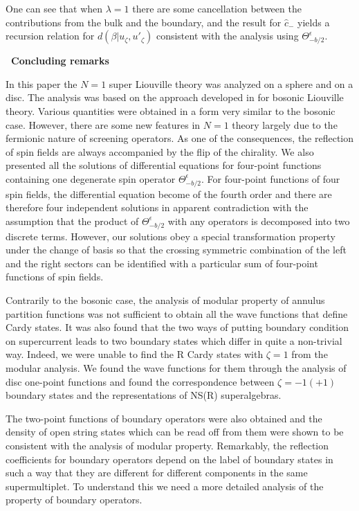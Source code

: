 \documentclass[a4paper,12pt]{article}
\def\section#1{
    \addtocounter{section}{1}\setcounter{subsection}{0}\setcounter{equation}{0}
    \vskip8mm\begin{center}{\bf\thesection~#1}\end{center}}
\newcommand{\ep}{{\epsilon}}
\begin{document}
 One can see that when $\lambda=1$ there are some cancellation
 between the contributions from the bulk and the boundary,
 and the result for $\hat{c}_-$ yields a recursion relation
 for $d(\beta|u_\zeta,u'_\zeta)$ consistent with the analysis
 using $\Theta_{-b/2}^\ep$.
 
\section{Concluding remarks}%

   In this paper the $N=1$ super Liouville theory was analyzed
 on a sphere and on a disc.
 The analysis was based on the approach developed in
 \cite{T,ZZ2,FZZ,ZZ} for bosonic Liouville theory.
 Various quantities were obtained in a form very similar to the
 bosonic case.
 However, there are some new features in $N=1$ theory largely
 due to the fermionic nature of screening operators.
 As one of the consequences, the reflection of spin fields
 are always accompanied by the flip of the chirality.
 We also presented all the solutions of differential equations
 for four-point functions containing one degenerate spin operator
 $\Theta_{-b/2}^{\ep}$.
 For four-point functions of four spin fields, the differential
 equation become of the fourth order and there are therefore four
 independent solutions in apparent contradiction with the assumption
 that the product of $\Theta_{-b/2}^{\ep}$ with any operators
 is decomposed into two discrete terms.
 However, our solutions obey a special transformation property
 under the change of basis so that the crossing symmetric combination
 of the left and the right sectors can be identified with
 a particular sum of four-point functions of spin fields.

   Contrarily to the bosonic case, the analysis of
 modular property of annulus partition functions was not
 sufficient to obtain all the wave functions that define Cardy
 states.
 It was also found that the two ways of putting boundary condition
 on supercurrent leads to two boundary states which differ in
 quite a non-trivial way.
 Indeed, we were unable to find the R Cardy states with $\zeta=1$
 from the modular analysis.
 We found the wave functions for them through the analysis of
 disc one-point functions and found the correspondence between
 $\zeta=-1(+1)$ boundary states and the representations
 of NS(R) superalgebras.

   The two-point functions of boundary operators were also obtained
 and the density of open string states which can be read off from
 them were shown to be consistent with the analysis of modular property.
 Remarkably, the reflection coefficients for boundary operators
 depend on the label of boundary states in such a way that they
 are different for different components in the same supermultiplet.
 To understand this we need a more detailed analysis of the property
 of boundary operators.
\end{document}
